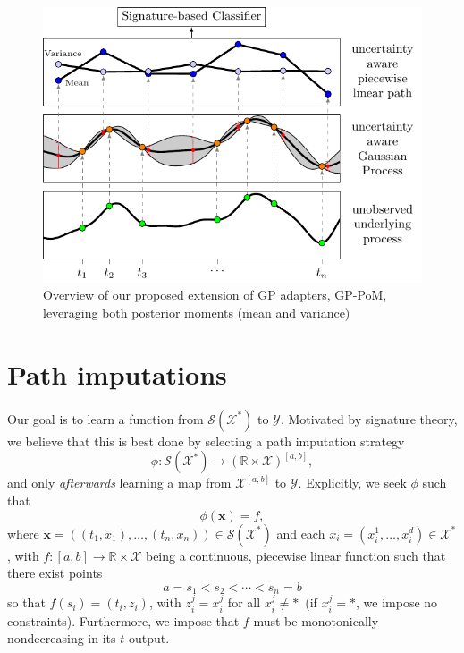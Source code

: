 \documentclass{article}
\newcommand{\reals}{\mathbb{R}}
\newcommand{\dataspace}{\mathcal{X}}
\newcommand{\lspace}{\mathcal{Y}}
\newcommand{\seriesspace}{\mathcal{S}}
\begin{document}
\begin{figure}[t]
    \centering
    \includegraphics{figures/overview.pdf}
    \caption{Overview of our proposed extension of GP adapters, GP-PoM, leveraging both posterior moments (mean and variance)}
    \label{fig:overview}
\end{figure}


\section{Path imputations}

Our goal is to learn a function from $\seriesspace(\dataspace^*)$ to
$\lspace$. Motivated by signature theory, we believe that this is best
done by selecting a path imputation strategy
%
\begin{equation}
    \phi \colon \seriesspace(\dataspace^*) \to (\reals \times \dataspace)^{[a, b]},
\end{equation}
and only \emph{afterwards} learning a map from $\dataspace^{[a, b]}$ to $\lspace$.
%
Explicitly, we seek $\phi$ such that
\begin{equation}\label{eq:phi}
\phi(\mathbf{x}) = f,    
\end{equation}
where
$\mathbf{x} = ((t_1, x_1), \ldots, (t_n, x_n)) \in
\seriesspace(\dataspace^*)$
and each $x_i = (x_i^1, \ldots, x_i^d) \in \dataspace^*$, %
with $f \colon [a, b] \to \reals \times \dataspace$ being a continuous,
piecewise linear function such that there exist points
\begin{equation}\label{eq:ss}
a = s_1 < s_2 < \cdots < s_n = b    
\end{equation}
so that $f(s_i) = (t_i, z_i)$, with $z_i^j = x_i^j$ for all $x_i^j \neq
*$~(if $x_i^j = *$, we impose no constraints).
%
Furthermore, we impose that $f$ must be monotonically nondecreasing in its $t$ output.
\end{document}
